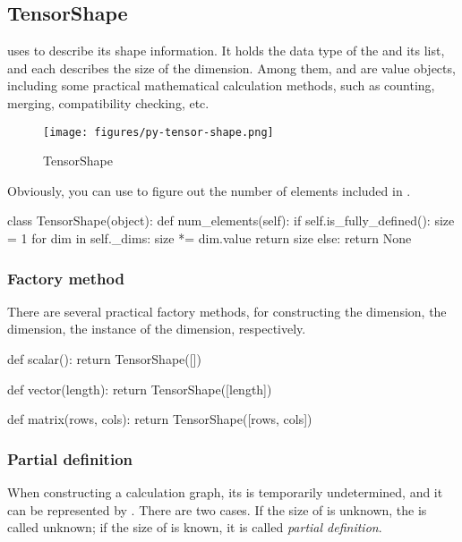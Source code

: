 \begin{content}
\subsection{TensorShape}
 uses  to describe its shape information. It holds the data type of the  and its  list, and each  describes the size of the dimension. Among them,  and  are value objects, including some practical mathematical calculation methods, such as counting, merging, compatibility checking, etc.

\begin{figure}[H]
  \centering
  \texttt{[image: figures/py-tensor-shape.png]}
  \caption{TensorShape}
  \label{fig:py-tensor-shape}
\end{figure}

Obviously, you can use  to figure out the number of elements included in .

\begin{leftbar}
\begin{python}
class TensorShape(object):
  def num_elements(self):
    if self.is_fully_defined():
      size = 1
      for dim in self._dims:
        size *= dim.value
      return size
    else:
      return None
\end{python}
\end{leftbar}      


\subsubsection{Factory method}
There are several practical factory methods,  for constructing the  dimension, the  dimension, the  instance of the  dimension, respectively.

\begin{leftbar}
\begin{python}
def scalar():
  return TensorShape([])

def vector(length):
  return TensorShape([length])

def matrix(rows, cols):
  return TensorShape([rows, cols])
\end{python}
\end{leftbar}


\subsubsection{Partial definition}
When constructing a calculation graph, its  is temporarily undetermined, and it can be represented by . There are two cases. If the size of  is unknown, the  is called unknown; if the size of  is known, it is called \emph{partial definition}.


\end{content}
